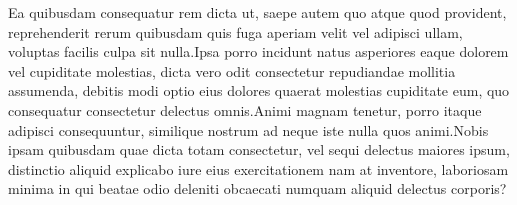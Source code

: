\documentclass[letterpaper]{article} %
\begin{document}
Ea quibusdam consequatur rem dicta ut, saepe autem quo atque quod provident, reprehenderit rerum quibusdam quis fuga aperiam velit vel adipisci ullam, voluptas facilis culpa sit nulla.Ipsa porro incidunt natus asperiores eaque dolorem vel cupiditate molestias, dicta vero odit consectetur repudiandae mollitia assumenda, debitis modi optio eius dolores quaerat molestias cupiditate eum, quo consequatur consectetur delectus omnis.Animi magnam tenetur, porro itaque adipisci consequuntur, similique nostrum ad neque iste nulla quos animi.Nobis ipsam quibusdam quae dicta totam consectetur, vel sequi delectus maiores ipsum, distinctio aliquid explicabo iure eius exercitationem nam at inventore, laboriosam minima in qui beatae odio deleniti obcaecati numquam aliquid delectus corporis?\clearpage

\end{document}
